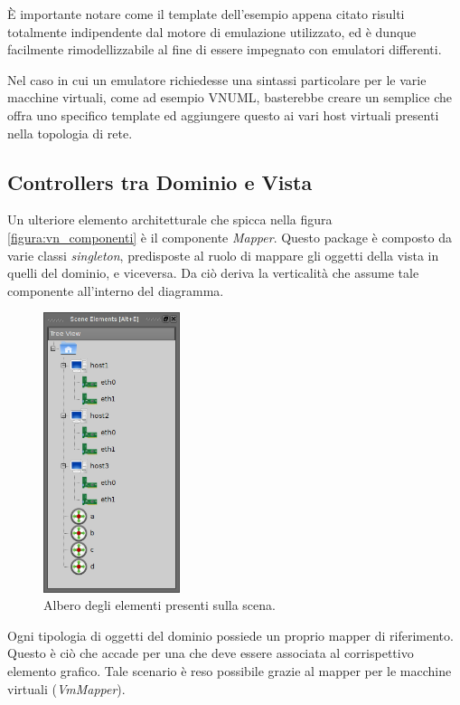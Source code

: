 È importante notare come il template dell'esempio appena citato risulti totalmente indipendente dal motore di emulazione utilizzato, ed è dunque facilmente rimodellizzabile al fine di essere impegnato con emulatori differenti.

Nel caso in cui un emulatore richiedesse una sintassi particolare per le varie macchine virtuali, come ad esempio VNUML, basterebbe creare un semplice \plugin{} che offra uno specifico template ed aggiungere questo \plugin{} ai vari host virtuali presenti nella topologia di rete.

\subsection{Controllers tra Dominio e Vista}
Un ulteriore elemento architetturale che spicca nella figura \ref{figura:vn_componenti} è il componente \emph{Mapper}. Questo package è composto da varie classi \emph{singleton}, predisposte al ruolo di mappare gli oggetti della vista in quelli del dominio, e viceversa. Da ciò deriva la verticalità che assume tale componente all'interno del diagramma.

\begin{figure}[!htb]
	\centering
	\includegraphics[width=4cm]{images/visualnetkit_tree_elements.png}
	\caption{Albero degli elementi presenti sulla scena.}
	\label{figura:scene_elements}
\end{figure}

Ogni tipologia di oggetti del dominio possiede un proprio mapper di riferimento. Questo è ciò che accade per una \virtualmachine{} che deve essere associata al corrispettivo elemento grafico. Tale scenario è reso possibile grazie al mapper per le macchine virtuali (\emph{VmMapper}).

